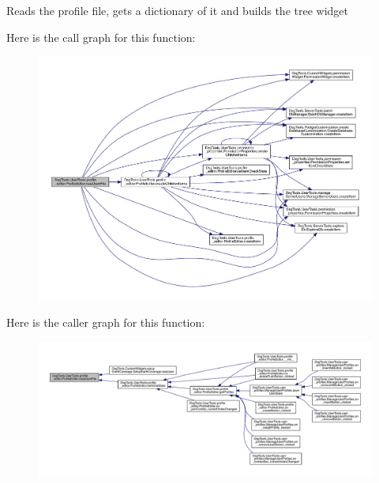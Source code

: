 \begin{DoxyVerb}Reads the profile file, gets a dictionary of it and builds the tree widget
\end{DoxyVerb}
 Here is the call graph for this function\+:
\nopagebreak
\begin{figure}[H]
\begin{center}
\leavevmode
\includegraphics[width=350pt]{class_dsg_tools_1_1_user_tools_1_1profile__editor_1_1_profile_editor_ae0b939974176fcb27653d2af4bdf7234_cgraph}
\end{center}
\end{figure}
Here is the caller graph for this function\+:
\nopagebreak
\begin{figure}[H]
\begin{center}
\leavevmode
\includegraphics[width=350pt]{class_dsg_tools_1_1_user_tools_1_1profile__editor_1_1_profile_editor_ae0b939974176fcb27653d2af4bdf7234_icgraph}
\end{center}
\end{figure}
\mbox{\label{class_dsg_tools_1_1_user_tools_1_1profile__editor_1_1_profile_editor_aca19b2e056761a396c13ad60233397c7}} 
